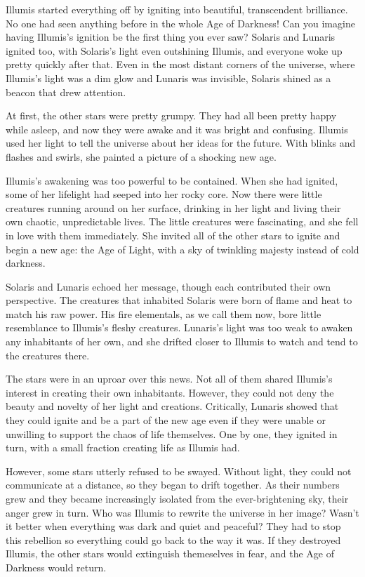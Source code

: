     Illumis started everything off by igniting into beautiful, transcendent brilliance.
    No one had seen anything before in the whole Age of Darkness!
    Can you imagine having Illumis's ignition be the first thing you ever saw?
    Solaris and Lunaris ignited too, with Solaris's light even outshining Illumis, and everyone woke up pretty quickly after that.
    Even in the most distant corners of the universe, where Illumis's light was a dim glow and Lunaris was invisible, Solaris shined as a beacon that drew attention.

    At first, the other stars were pretty grumpy.
    They had all been pretty happy while asleep, and now they were awake and it was bright and confusing.
    Illumis used her light to tell the universe about her ideas for the future.
    With blinks and flashes and swirls, she painted a picture of a shocking new age.

    Illumis's awakening was too powerful to be contained.
    When she had ignited, some of her lifelight had seeped into her rocky core.
    Now there were little creatures running around on her surface, drinking in her light and living their own chaotic, unpredictable lives.
    The little creatures were fascinating, and she fell in love with them immediately.
    She invited all of the other stars to ignite and begin a new age: the Age of Light, with a sky of twinkling majesty instead of cold darkness.

    Solaris and Lunaris echoed her message, though each contributed their own perspective.
    The creatures that inhabited Solaris were born of flame and heat to match his raw power.
    His fire elementals, as we call them now, bore little resemblance to Illumis's fleshy creatures.
    Lunaris's light was too weak to awaken any inhabitants of her own, and she drifted closer to Illumis to watch and tend to the creatures there.

    The stars were in an uproar over this news.
    Not all of them shared Illumis's interest in creating their own inhabitants.
    However, they could not deny the beauty and novelty of her light and creations.
    Critically, Lunaris showed that they could ignite and be a part of the new age even if they were unable or unwilling to support the chaos of life themselves.
    One by one, they ignited in turn, with a small fraction creating life as Illumis had.

    However, some stars utterly refused to be swayed.
    Without light, they could not communicate at a distance, so they began to drift together.
    As their numbers grew and they became increasingly isolated from the ever-brightening sky, their anger grew in turn.
    Who was Illumis to rewrite the universe in her image?
    Wasn't it better when everything was dark and quiet and peaceful?
    They had to stop this rebellion so everything could go back to the way it was.
    If they destroyed Illumis, the other stars would extinguish themeselves in fear, and the Age of Darkness would return.

